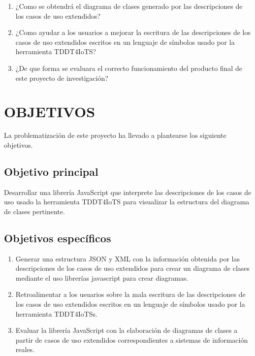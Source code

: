 \documentclass[12pt,a4paper,final]{article}
\begin{document}
	\begin{enumerate}
		\item ¿Como se obtendrá el diagrama de clases generado por las descripciones de los casos de uso extendidos?
		
		\item ¿Como ayudar a los usuarios a mejorar la escritura de las descripciones de los casos de uso extendidos escritos en un lenguaje de símbolos usado por la herramienta TDDT4IoTS?
		
		\item ¿De que forma se evaluara el correcto funcionamiento del producto final de este proyecto de investigación?
	\end{enumerate}
	
	\section{OBJETIVOS}
	
	La problematización de este proyecto ha llevado a plantearse los siguiente objetivos.
	
	\subsection{Objetivo principal}
	
	Desarrollar una librería JavaScript que interprete las descripciones de los casos de uso usado la herramienta TDDT4IoTS para visualizar la estructura del diagrama de clases pertinente. 
	
	\subsection{Objetivos específicos}
	
	\begin{enumerate}
		\item Generar una estructura JSON y XML con la información obtenida por las descripciones de los casos de uso extendidos para crear un diagrama de clases mediante el uso librerías javascript para crear diagramas.
		
		\item Retroalimentar a los usuarios sobre la mala escritura de las descripciones de los casos de uso extendidos escritos en un lenguaje de símbolos usado por la herramienta TDDT4IoTSs. 
		
		\item Evaluar la librería JavaScript con la elaboración de diagramas de clases a partir de casos de uso extendidos correspondientes a sistemas de información reales.
	\end{enumerate}
	
\end{document}
